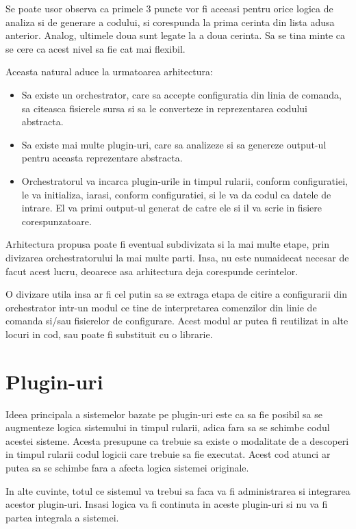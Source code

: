 \documentclass{report}
\begin{document}
Se poate usor observa ca primele 3 puncte vor fi aceeasi pentru orice
logica de analiza si de generare a codului, si corespunda la prima
cerinta din lista adusa anterior. Analog, ultimele doua sunt legate la a
doua cerinta. Sa se tina minte ca se cere ca acest nivel sa fie cat mai
flexibil.

Aceasta natural aduce la urmatoarea arhitectura:

\begin{itemize}
\item
  Sa existe un orchestrator, care sa accepte configuratia din linia de
  comanda, sa citeasca fisierele sursa si sa le converteze in
  reprezentarea codului abstracta.
\item
  Sa existe mai multe plugin-uri, care sa analizeze si sa genereze
  output-ul pentru aceasta reprezentare abstracta.
\item
  Orchestratorul va incarca plugin-urile in timpul rularii, conform
  configuratiei, le va initializa, iarasi, conform configuratiei, si le
  va da codul ca datele de intrare. El va primi output-ul generat de
  catre ele si il va scrie in fisiere corespunzatoare.
\end{itemize}

Arhitectura propusa poate fi eventual subdivizata si la mai multe etape,
prin divizarea orchestratorului la mai multe parti. Insa, nu este
numaidecat necesar de facut acest lucru, deoarece asa arhitectura deja
corespunde cerintelor.

O divizare utila insa ar fi cel putin sa se extraga etapa de citire a
configurarii din orchestrator intr-un modul ce tine de interpretarea
comenzilor din linie de comanda si/sau fisierelor de configurare. Acest
modul ar putea fi reutilizat in alte locuri in cod, sau poate fi
substituit cu o librarie.

\section{Plugin-uri}

Ideea principala a sistemelor bazate pe plugin-uri este ca sa fie
posibil sa se augmenteze logica sistemului in timpul rularii, adica fara
sa se schimbe codul acestei sisteme. Acesta presupune ca trebuie sa
existe o modalitate de a descoperi in timpul rularii codul logicii care
trebuie sa fie executat. Acest cod atunci ar putea sa se schimbe fara a
afecta logica sistemei originale.

In alte cuvinte, totul ce sistemul va trebui sa faca va fi administrarea
si integrarea acestor plugin-uri. Insasi logica va fi continuta in
aceste plugin-uri si nu va fi partea integrala a sistemei.
\end{document}
